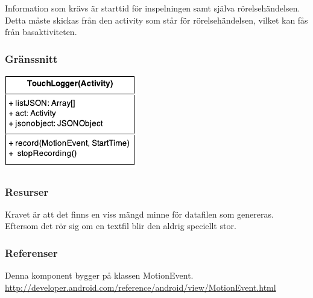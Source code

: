 Information som krävs är starttid för inspelningen samt själva rörelsehändelsen. Detta måste skickas från den activity som står för rörelsehändelsen, vilket kan fås från basaktiviteten.
\subsubsection{Gränssnitt}
\includegraphics[scale=1.0]{TouchLogger.pdf}
\subsubsection{Resurser}
Kravet är att det finns en viss mängd minne för datafilen som genereras. Eftersom det rör sig om en textfil blir den aldrig speciellt stor.
\subsubsection{Referenser}
Denna komponent bygger på klassen MotionEvent.
\url{http://developer.android.com/reference/android/view/MotionEvent.html}
